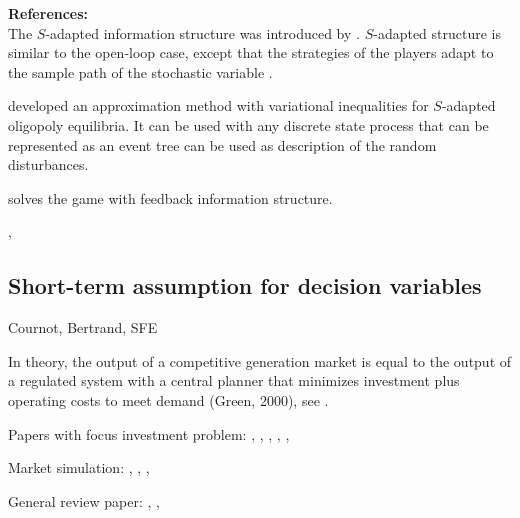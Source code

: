 \textbf{References:} \cite{Salant1982, Wolf1997, Haurie2002, Pineau2003, Murto2004}\\


The $S$-adapted information structure was introduced by \cite{Haurie1990}.
$S$-adapted structure is similar to the open-loop case, except that the strategies of the players adapt to the sample path of the stochastic variable \citep[see][pg. 128]{Pineau2003}.

\cite{Haurie2002} developed an approximation method with variational inequalities for $S$-adapted oligopoly equilibria. It can be used with any discrete state process that can be represented as an event tree can be used as description of the random disturbances.

\cite{Murto2004} solves the game with feedback information structure.

\cite{Haurie2001}, \cite{Genc2007}

\subsection{Short-term assumption for decision variables}

Cournot, Bertrand, SFE


In theory, the output of a competitive generation market is equal to the output of a regulated system with a central planner that minimizes investment plus operating costs to meet demand (Green, 2000), see \citep[see][pg. 111]{Rothwell2003}.

Papers with focus investment problem: \cite{Pineau2003}, \cite{Murphy2005}, \cite{Genc2007}, \cite{Kiesling2007}, \cite{Barmack2007}, \cite{Sauma2006}

Market simulation: \cite{Torre2003}, \cite{Valenzuela2007}, \cite{Hobbs2001},\cite{Otero-Novas2000}

General review paper: \cite{Neuhoff2005}, \cite{Ventosa2005}, \cite{Kahn1998}

